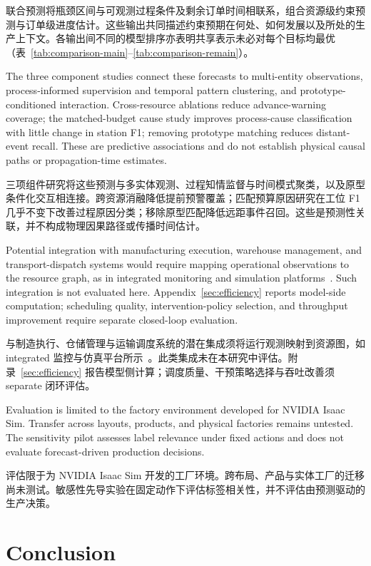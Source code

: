 \documentclass[a4paper,fleqn]{cas-dc}
\newcommand{\zhpara}[1]{%
  \par\begingroup\small\color{black!72}\noindent #1\par\endgroup}
\begin{document}
\zhpara{联合预测将瓶颈区间与可观测过程条件及剩余订单时间相联系，组合资源级约束预测与订单级进度估计。这些输出共同描述约束预期在何处、如何发展以及所处的生产上下文。各输出间不同的模型排序亦表明共享表示未必对每个目标均最优（表~\ref{tab:comparison-main}--\ref{tab:comparison-remain}）。}


The three component studies connect these forecasts to multi-entity observations, process-informed supervision and temporal pattern clustering, and prototype-conditioned interaction. Cross-resource ablations reduce advance-warning coverage; the matched-budget cause study improves process-cause classification with little change in station F1; removing prototype matching reduces distant-event recall. These are predictive associations and do not establish physical causal paths or propagation-time estimates.

\zhpara{三项组件研究将这些预测与多实体观测、过程知情监督与时间模式聚类，以及原型条件化交互相连接。跨资源消融降低提前预警覆盖；匹配预算原因研究在工位 F1 几乎不变下改善过程原因分类；移除原型匹配降低远距事件召回。这些是预测性关联，并不构成物理因果路径或传播时间估计。}


Potential integration with manufacturing execution, warehouse management, and transport-dispatch systems would require mapping operational observations to the resource graph, as in integrated monitoring and simulation platforms~\cite{leng2023monitoring}. Such integration is not evaluated here. Appendix~\ref{sec:efficiency} reports model-side computation; scheduling quality, intervention-policy selection, and throughput improvement require separate closed-loop evaluation.

\zhpara{与制造执行、仓储管理与运输调度系统的潜在集成须将运行观测映射到资源图，如 integrated 监控与仿真平台所示~\cite{leng2023monitoring}。此类集成未在本研究中评估。附录~\ref{sec:efficiency} 报告模型侧计算；调度质量、干预策略选择与吞吐改善须 separate 闭环评估。}


Evaluation is limited to the factory environment developed for NVIDIA Isaac Sim. Transfer across layouts, products, and physical factories remains untested. The sensitivity pilot assesses label relevance under fixed actions and does not evaluate forecast-driven production decisions.

\zhpara{评估限于为 NVIDIA Isaac Sim 开发的工厂环境。跨布局、产品与实体工厂的迁移尚未测试。敏感性先导实验在固定动作下评估标签相关性，并不评估由预测驱动的生产决策。}


\section{Conclusion}\label{sec:conclusion}
\end{document}
